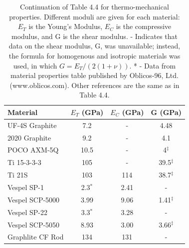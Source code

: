 \documentclass{report}
\begin{document}
\begin{table}[htb]
\centering
\begin{threeparttable}
\begin{tabular}{lccc}
\toprule
\textbf{Material} & $E_{T}$ (GPa) & $E_{C}$ (GPa) & G (GPa) \\
\midrule
 UF-4S Graphite & 7.2 & - & 4.48 \\
 2020 Graphite & 9.2 & - & 4.1 \\
 POCO AXM-5Q & 10.5 & - & 4$^{\ddag}$ \\
 Ti 15-3-3-3 & 105 & - & 39.5$^{\ddag}$ \\
 Ti 21S & 103 & 114 & 38.7$^{\ddag}$ \\
 Vespel SP-1 & 2.3$^{*}$ & 2.41 & - \\
 Vespel SCP-5000 & 3.99 & 9.06 & 1.41$^{\ddag}$\\
 Vespel SP-22 & 3.3$^{*}$ & 3.28 & - \\
 Vespel SCP-5050 & 8.93 & 3.00 & 3.66$^{\ddag}$\\
 Graphlite CF Rod & 134 & 131 & - \\
 \bottomrule
\end{tabular}
\caption{Continuation of Table 4.4 for thermo-mechanical properties. Different moduli are given for each material: $E_{T}$ is the Young's Modulus, $E_{C}$ is the compressive modulus, and G is the shear modulus. \ddag - Indicates that data on the shear modulus, G, was unavailable; instead, the formula for homogenous and isotropic materials was used, in which $G = E_{T}/(2(1 + \nu))$. * - Data from material properties table published by Oblicos-96, Ltd. (www.oblicos.com). Other references are the same as in Table 4.4. }
\end{threeparttable}
\end{table}
\end{document}
